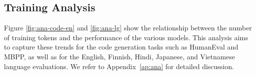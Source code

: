 










\subsection{Training Analysis}

Figure \ref{fig:ana-code-en} and \ref{fig:ana-lg} show the relationship between the number of training tokens and the performance of the various models. This analysis aims to capture these trends for the code generation tasks such as HumanEval and MBPP, as well as for the English, Finnish, Hindi, Japanese, and Vietnamese language evaluations. We refer to Appendix~\ref{ap:ana} for detailed discussion.